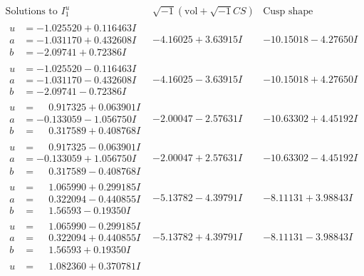 \documentclass[1p]{elsarticle_modified}
\theoremstyle{definition}
\newcommand{\I}{\sqrt{-1}}
\begin{document}
$$\begin{array}{c|c|c}  
\text{Solutions to }I^u_{1}& \I (\text{vol} + \sqrt{-1}CS) & \text{Cusp shape}\\
 \hline 
\begin{aligned}
u &= -1.025520 + 0.116463 I \\
a &= -1.031170 + 0.432608 I \\
b &= -2.09741 + 0.72386 I\end{aligned}
 & -4.16025 + 3.63915 I & -10.15018 - 4.27650 I \\ \hline\begin{aligned}
u &= -1.025520 - 0.116463 I \\
a &= -1.031170 - 0.432608 I \\
b &= -2.09741 - 0.72386 I\end{aligned}
 & -4.16025 - 3.63915 I & -10.15018 + 4.27650 I \\ \hline\begin{aligned}
u &= \phantom{-}0.917325 + 0.063901 I \\
a &= -0.133059 - 1.056750 I \\
b &= \phantom{-}0.317589 + 0.408768 I\end{aligned}
 & -2.00047 - 2.57631 I & -10.63302 + 4.45192 I \\ \hline\begin{aligned}
u &= \phantom{-}0.917325 - 0.063901 I \\
a &= -0.133059 + 1.056750 I \\
b &= \phantom{-}0.317589 - 0.408768 I\end{aligned}
 & -2.00047 + 2.57631 I & -10.63302 - 4.45192 I \\ \hline\begin{aligned}
u &= \phantom{-}1.065990 + 0.299185 I \\
a &= \phantom{-}0.322094 - 0.440855 I \\
b &= \phantom{-}1.56593 - 0.19350 I\end{aligned}
 & -5.13782 - 4.39791 I & -8.11131 + 3.98843 I \\ \hline\begin{aligned}
u &= \phantom{-}1.065990 - 0.299185 I \\
a &= \phantom{-}0.322094 + 0.440855 I \\
b &= \phantom{-}1.56593 + 0.19350 I\end{aligned}
 & -5.13782 + 4.39791 I & -8.11131 - 3.98843 I \\ \hline\begin{aligned}
u &= \phantom{-}1.082360 + 0.370781 I \\

\end{aligned}
\end{array}$$
\end{document}

